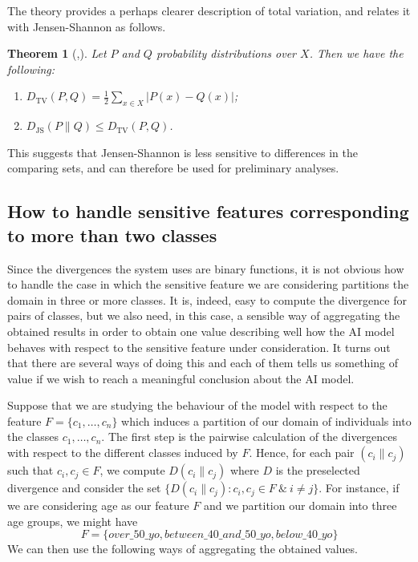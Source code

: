 \documentclass[
]{ceurart}
\newtheorem*{theorem*}{Theorem}
\begin{document}
The theory provides a perhaps clearer description of total variation, and relates it with Jensen-Shannon as follows.

\begin{theorem*}[{\cite[Prop. 4.2]{levin2017markov}},{\cite[Thm. 3]{lin_divergence}}]
Let $P$ and $Q$ probability distributions over $X$. Then we have the following:
\begin{enumerate}
\item $D_{\mathrm{TV}}(P,Q)=\frac{1}{2}\sum_{x\in X}\vert P(x)-Q(x)\vert$;
\vspace{0.2cm}
\item $D_{\mathrm{JS}}(P\parallel Q)\leq D_\mathrm{TV}(P,Q)$.
\vspace{0.2cm}
\end{enumerate}
\end{theorem*}

This suggests that Jensen-Shannon is less sensitive to differences in the comparing sets, and can therefore be used for preliminary analyses.

\subsection{How to handle sensitive features corresponding to more than two classes}\label{subsec:aggregation}
Since the divergences the system uses are binary functions, it is not obvious how to handle the case in which the sensitive feature we are considering partitions the domain in three or more classes. It is, indeed, easy to compute the divergence for pairs of classes, but we also need, in this case, a sensible way of aggregating the obtained results in order to obtain one value describing well how the AI model behaves with respect to the sensitive feature under consideration. It turns out that there are several ways of doing this and each of them tells us something of value if we wish to reach a meaningful conclusion about the AI model.

Suppose that we are studying the behaviour of the model with respect to the feature $F=\{c_1, \ldots , c_n\}$ which induces a partition of our domain of individuals into the classes $c_1, \ldots , c_n$. The first step is the pairwise calculation of the divergences with respect to the different classes induced by $F$. Hence, for each pair $(c_i\parallel c_j)$ such that $c_i, c_j\in F$, we compute $D(c_i\parallel c_j) $ where $D$ is the  preselected divergence and consider the set $\{D(c_i\parallel c_j) : c_i,c_j\in F\ \&\ i\neq j\}$. For instance, if we are considering age as our feature  $F$ and we partition our domain into three age groups, we might have
\[F=\{over\_50\_yo, between\_40\_and\_50\_yo, below\_40\_yo\}\]
We can then use the following ways of aggregating the obtained values.
\end{document}

